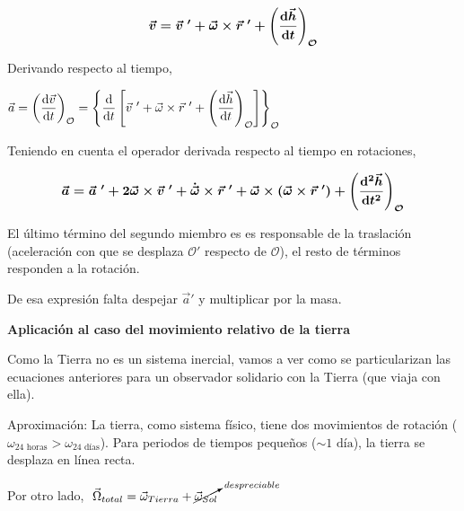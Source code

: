 $$\boldsymbol{ \displaystyle \vec v=\vec v\ ' + \vec \omega \times \vec r\ '+  \left( \dv{\vec h}{t} \right)_{\mathcal O} }$$


Derivando respecto al tiempo,

$\vec a= \left( \displaystyle \dv{\vec v}{t} \right)_{\mathcal O}=
\left\{  
\displaystyle \dv{t} \left[
\vec v \ ' + \vec \omega \times \vec r\ ' + \left( \dv{\vec h}{t} \right)_{\mathcal O}
\right]
\right\}_{\mathcal{O}}$

Teniendo en cuenta el operador derivada respecto al tiempo en rotaciones,

$$\boldsymbol{ 
\vec a = \vec a\ ' + 2 \vec \omega \times \vec v\ '+ \dot{\vec \omega}\times \vec r \ ' + \vec \omega \times (\vec \omega \times \vec r \ ')+ \left( \displaystyle \dv[2]{\vec h}{t} \right)_{\mathcal O}
}$$

El último término del segundo miembro es es responsable de la traslación (aceleración con que se desplaza $\mathcal{O '}$ respecto de $\mathcal{O}$), el resto de términos responden a la rotación.

De esa expresión falta despejar $\vec a'$ y multiplicar por la masa.


\textbf{Aplicación al caso del movimiento relativo de la tierra}

Como la Tierra no es un sistema inercial, vamos a ver como se particularizan las ecuaciones anteriores para un observador solidario con la Tierra (que viaja con ella).

Aproximación: La tierra, como sistema físico, tiene dos movimientos de rotación ($\omega_{24\text{ horas}}>\omega_{24\text{ días}}$). Para periodos de tiempos pequeños ($\sim 1 \text{ día}$), la tierra se desplaza en línea recta.

Por otro lado, $\ \vec \Omega_{total}=\vec \omega_{Tierra}+ \cancelto{despreciable}{\vec \omega_{Sol}}$  

